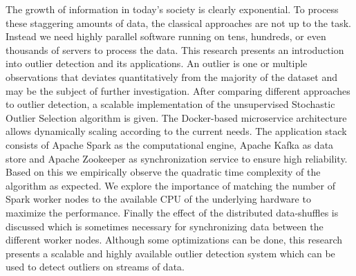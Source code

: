 The growth of information in today’s society is clearly exponential. To process these staggering amounts of data, the classical approaches are not up to the task. Instead we need highly parallel software running on tens, hundreds, or even thousands of servers to process the data. This research presents an introduction into outlier detection and its applications. An outlier is one or multiple observations that deviates quantitatively from the majority of the dataset and may be the subject of further investigation. After comparing different approaches to outlier detection, a scalable implementation of the unsupervised Stochastic Outlier Selection algorithm is given. The Docker-based microservice architecture allows dynamically scaling according to the current needs. The application stack consists of Apache Spark as the computational engine, Apache Kafka as data store and Apache Zookeeper as synchronization service to ensure high reliability. Based on this we empirically observe the quadratic time complexity of the algorithm as expected. We explore the importance of matching the number of Spark worker nodes to the available CPU of the underlying hardware to maximize the performance. Finally the effect of the distributed data-shuffles is discussed which is sometimes necessary for synchronizing data between the different worker nodes. Although some optimizations can be done, this research presents a scalable and highly available outlier detection system which can be used to detect outliers on streams of data.